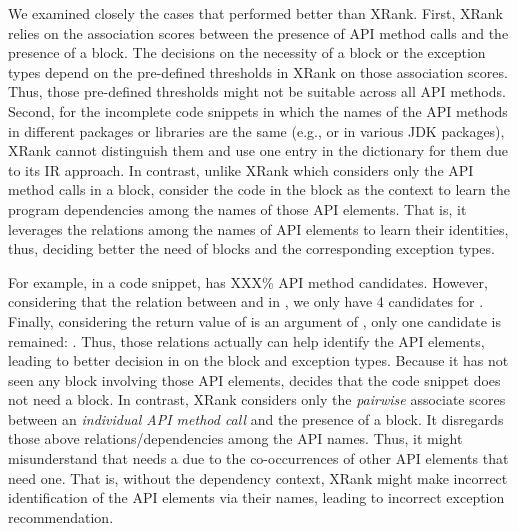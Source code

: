 We examined closely the cases that {\tool} performed better than
XRank.  First, XRank relies on the association scores between the
presence of API method calls and the presence of a 
block. The decisions on the necessity of a  block or
the exception types depend on the pre-defined thresholds in XRank on
those association scores. Thus, those pre-defined thresholds might not
be suitable across all API methods. Second, for the incomplete
code snippets in which the names of the API methods in different
packages or libraries are the same (e.g.,  or
 in various JDK packages), XRank cannot distinguish them
and use one entry in the dictionary for them due to its IR
approach. In contrast, unlike XRank which considers only the API
method calls in a  block, {\tool} consider the code in
the block as the context to learn the program dependencies among the
names of those API elements. That is, it leverages the relations among
the names of API elements to learn their identities, thus,
deciding better the need of  blocks and the
corresponding exception types.

For example, in a code snippet,  has XXX\% API method
candidates. However, considering that the relation between 
and  in , we only have
4 candidates for . Finally, considering the return value
of  is an argument of , only one
candidate is remained:
.
Thus, those relations actually can help identify the API elements,
leading to better decision in {\tool} on the  block
and exception types. Because it has not seen any 
block involving those API elements, {\tool} decides that the code
snippet does not need a  block. In contrast, XRank
considers only the {\em pairwise} associate scores between an {\em
  individual API method call} and the presence of a 
block. It disregards those above relations/dependencies among the API
names. Thus, it might misunderstand that  needs a
 due to the co-occurrences of other API elements that
need one. That is, without the dependency context, XRank might
make incorrect identification of the API elements via their names,
leading to incorrect exception recommendation.
